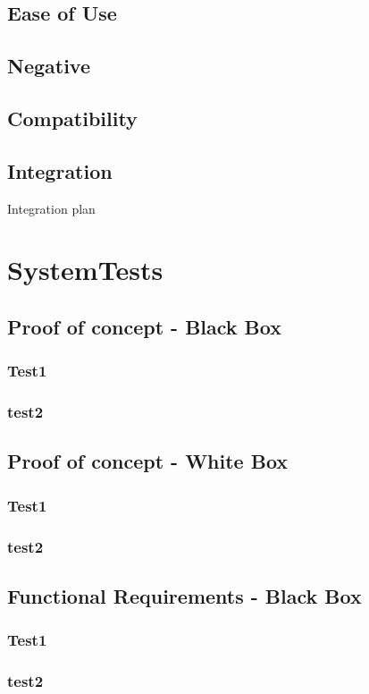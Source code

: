 \documentclass{article}
\begin{document}
\subsection{Ease of Use}
\subsection{Negative}
\subsection{Compatibility}
\subsection{Integration}
Integration plan

\section{SystemTests}
\subsection{Proof of concept - Black Box}
\subsubsection{Test1}
\subsubsection{test2}
\subsection{Proof of concept - White Box}
\subsubsection{Test1}
\subsubsection{test2}
\subsection{Functional Requirements - Black Box}
\subsubsection{Test1}
\subsubsection{test2}
\end{document}
